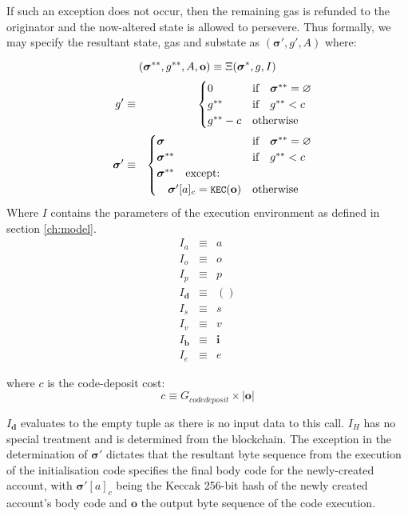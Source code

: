 \documentclass[9pt,oneside]{amsart}
\begin{document}
\begin{multicols}{2}
If such an exception does not occur, then the remaining gas is refunded to the originator and the now-altered state is allowed to persevere. Thus formally, we may specify the resultant state, gas and substate as $(\boldsymbol{\sigma}', g', A)$ where:

\begin{equation}
(\boldsymbol{\sigma}^{**}, g^{**}, A, \mathbf{o}) \equiv \Xi(\boldsymbol{\sigma}^*, g, I) \\
\end{equation}
\begin{eqnarray}
\quad g' & \equiv & \begin{cases}
0 & \text{if} \quad \boldsymbol{\sigma}^{**} = \varnothing \\
g^{**} & \text{if} \quad g^{**} < c \\
g^{**} - c & \text{otherwise} \\
\end{cases} \\
\quad \boldsymbol{\sigma}' & \equiv & \begin{cases}
\boldsymbol{\sigma} & \text{if} \quad \boldsymbol{\sigma}^{**} = \varnothing \\
\boldsymbol{\sigma}^{**} & \text{if} \quad g^{**} < c \\
\boldsymbol{\sigma}^{**} \quad \text{except:} & \\
\quad\boldsymbol{\sigma}'[a]_c = \texttt{\small KEC}(\mathbf{o}) & \text{otherwise}
\end{cases}
\end{eqnarray}
Where $I$ contains the parameters of the execution environment as defined in section \ref{ch:model}.
\begin{eqnarray}
I_a & \equiv & a \\
I_o & \equiv & o \\
I_p & \equiv & p \\
I_\mathbf{d} & \equiv & () \\
I_s & \equiv & s \\
I_v & \equiv & v \\
I_\mathbf{b} & \equiv & \mathbf{i} \\
I_e & \equiv & e
\end{eqnarray}

where $c$ is the code-deposit cost:
\begin{equation}
c \equiv G_{codedeposit} \times |\mathbf{o}|
\end{equation}

$I_\mathbf{d}$ evaluates to the empty tuple as there is no input data to this call. $I_H$ has no special treatment and is determined from the blockchain. The exception in the determination of $\boldsymbol{\sigma}'$ dictates that the resultant byte sequence from the execution of the initialisation code specifies the final body code for the newly-created account, with $\boldsymbol{\sigma}'[a]_c$ being the Keccak 256-bit hash of the newly created account's body code and $\mathbf{o}$ the output byte sequence of the code execution.


\end{multicols}
\end{document}
